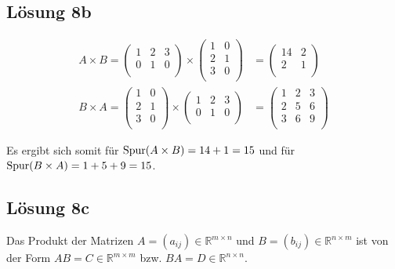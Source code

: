 \documentclass[main.tex]{subfiles}
\begin{document}
\subsection{Lösung 8b}
\begin{align*}
    A\times B = \begin{pmatrix}
        1 & 2 & 3 \\
        0 & 1 & 0 \\
    \end{pmatrix} \times \begin{pmatrix}
        1 & 0 \\
        2 & 1 \\
        3 & 0 \\
    \end{pmatrix} &= \begin{pmatrix}
        14 & 2 \\
        2 & 1 \\
    \end{pmatrix}\\
    B\times A = \begin{pmatrix}
        1 & 0 \\
        2 & 1 \\
        3 & 0 \\
    \end{pmatrix} \times \begin{pmatrix}
        1 & 2 & 3 \\
        0 & 1 & 0 \\
    \end{pmatrix} &= \begin{pmatrix}
            1 & 2 & 3 \\
            2 & 5 & 6 \\
            3 & 6 & 9 \\
    \end{pmatrix}
\end{align*}

Es ergibt sich somit für $\operatorname{Spur} (A\times B) = 14 + 1 = 15$ und für $\operatorname{Spur} (B\times A) = 1 + 5 + 9 = 15$.

\subsection*{Lösung 8c}
Das Produkt der Matrizen $A = (a_{ij}) \in \mathbb{R}^{m\times n}$ und $B = (b_{ij}) \in \mathbb{R}^{n\times m}$
ist von der Form $AB = C \in \mathbb{R}^{m\times m}$ bzw. $BA = D \in \mathbb{R}^{n \times n}$.\\
\end{document}
